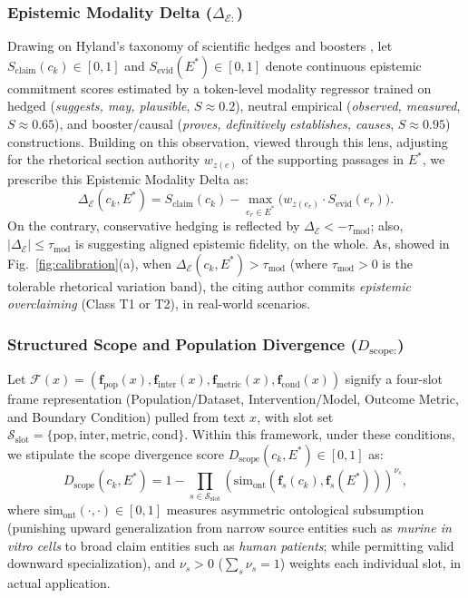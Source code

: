\documentclass[sigconf]{acmart}
\begin{document}
\subsubsection{Epistemic Modality Delta (\texorpdfstring{$\Delta_{\mathcal{E:}}$}{Delta E})}
Drawing on Hyland's taxonomy of scientific hedges and boosters \cite{hyland1998hedging}, let $S_{\text{claim}}(c_k) \in [0, 1]$ and $S_{\text{evid}}(E^*) \in [0, 1]$ denote continuous epistemic commitment scores estimated by a token-level modality regressor trained on hedged (\emph{suggests, may, plausible}, $S \approx 0.2$), neutral empirical (\emph{observed, measured}, $S \approx 0.65$), and booster/causal (\emph{proves, definitively establishes, causes}, $S \approx 0.95$) constructions. Building on this observation, viewed through this lens, adjusting for the rhetorical section authority $w_{z(e)}$ of the supporting passages in $E^*$, we prescribe this Epistemic Modality Delta as:
\begin{equation}
\Delta_{\mathcal{E}}(c_k, E^*) = S_{\text{claim}}(c_k) - \max_{e_r \in E^*} \Big( w_{z(e_r)} \cdot S_{\text{evid}}(e_r) \Big).
\label{eq:epistemic_delta}
\end{equation}
On the contrary, conservative hedging is reflected by $\Delta_{\mathcal{E}} < -\tau_{\text{mod}}$; also, $|\Delta_{\mathcal{E}}| \leq \tau_{\text{mod}}$ is suggesting aligned epistemic fidelity, on the whole. As, showed in Fig.~\ref{fig:calibration}(a), when $\Delta_{\mathcal{E}}(c_k, E^*) > \tau_{\text{mod}}$ (where $\tau_{\text{mod}} > 0$ is the tolerable rhetorical variation band), the citing author commits \emph{epistemic overclaiming} (Class T1 or T2), in real-world scenarios.

\subsubsection{Structured Scope and Population Divergence (\texorpdfstring{$D_{\text{scope:}}$}{D scope})}
Let $\mathcal{F}(x) = (\mathbf{f}_{\text{pop}}(x), \mathbf{f}_{\text{inter}}(x), \mathbf{f}_{\text{metric}}(x), \mathbf{f}_{\text{cond}}(x))$ signify a four-slot frame representation (Population/Dataset, Intervention/Model, Outcome Metric, and Boundary Condition) pulled from text $x$, with slot set $\mathcal{S}_{\text{slot}} = \{\text{pop}, \text{inter}, \text{metric}, \text{cond}\}$. Within this framework, under these conditions, we stipulate the scope divergence score $D_{\text{scope}}(c_k, E^*) \in [0, 1]$ as:
\begin{equation}
D_{\text{scope}}(c_k, E^*) = 1 - \prod_{s \in \mathcal{S}_{\text{slot}}} \left( \text{sim}_{\text{ont}}\!\left(\mathbf{f}_s(c_k), \mathbf{f}_s(E^*)\right) \right)^{\nu_s},
\label{eq:scope_div}
\end{equation}
where $\text{sim}_{\text{ont}}(\cdot, \cdot) \in [0, 1]$ measures asymmetric ontological subsumption (punishing upward generalization from narrow source entities such as \emph{murine in vitro cells} to broad claim entities such as \emph{human patients}; while permitting valid downward specialization), and $\nu_s > 0$ ($\sum_s \nu_s = 1$) weights each individual slot, in actual application.
\end{document}
